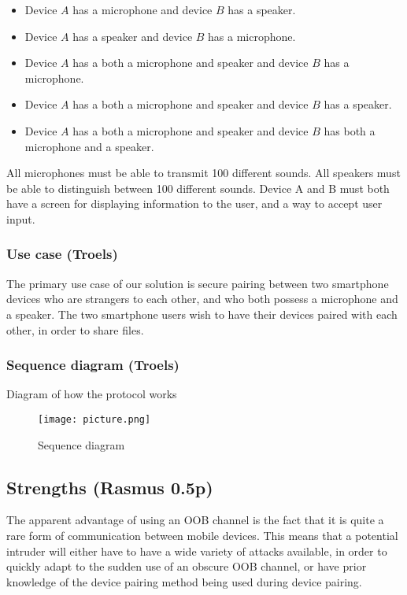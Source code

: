 \documentclass[12pt]{article}
\begin{document}
\begin{itemize}
    \item Device $A$ has a microphone and device $B$ has a speaker.
    \item Device $A$ has a speaker and device $B$ has a microphone.
    \item Device $A$ has a both a microphone and speaker and device $B$ has a microphone.
    \item Device $A$ has a both a microphone and speaker and device $B$ has a speaker.
    \item Device $A$ has a both a microphone and speaker and device $B$ has both a microphone and a speaker.
\end{itemize}

All microphones must be able to transmit 100 different sounds.
All speakers must be able to distinguish between 100 different sounds.
Device A and B must both have a screen for displaying information to the user, and a way to accept user input.

\subsubsection{Use case (Troels)}
\label{subs:Use case}

The primary use case of our solution is secure pairing between two smartphone devices who are strangers to each other, and who both possess a microphone and a speaker.
The two smartphone users wish to have their devices paired with each other, in order to share files.
\fi
\subsubsection{Sequence diagram (Troels)}
\label{subs:Sequence diagram}

Diagram of how the protocol works

\begin{figure}[h!]
    \texttt{[image: picture.png]}
    \caption{Sequence diagram}
\end{figure}

\newpage

\subsection{Strengths (Rasmus 0.5p)}
\label{sub:Strengths}

The apparent advantage of using an OOB channel is the fact that it is quite a rare form of communication between mobile devices. This means that a potential intruder will either have to have a wide variety of attacks available, in order to quickly adapt to the sudden use of an obscure OOB channel, or have prior knowledge of the device pairing method being used during device pairing.
\end{document}
